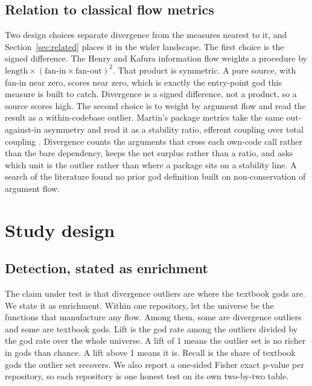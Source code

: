 \documentclass[11pt,a4paper]{article}
\begin{document}
\subsection{Relation to classical flow metrics}
Two design choices separate divergence from the measures nearest to it, and
Section~\ref{sec:related} places it in the wider landscape. The first choice is the
signed difference. The Henry and Kafura information flow \cite{henrykafura} weights
a procedure by $\mathrm{length} \times (\mathrm{fan\text{-}in} \times
\mathrm{fan\text{-}out})^2$. That product is symmetric. A pure source, with fan-in
near zero, scores near zero, which is exactly the entry-point god this measure is
built to catch. Divergence is a signed difference, not a product, so a source
scores high. The second choice is to weight by argument flow and read the result as
a within-codebase outlier. Martin's package metrics take the same out-against-in
asymmetry and read it as a stability ratio, efferent coupling over total coupling
\cite{martin}. Divergence counts the arguments that cross each own-code call rather
than the bare dependency, keeps the net surplus rather than a ratio, and asks which
unit is the outlier rather than where a package sits on a stability line. A search
of the literature found no prior god definition built on non-conservation of
argument flow.

\section{Study design}\label{sec:design}
\subsection{Detection, stated as enrichment}
The claim under test is that divergence outliers are where the textbook gods are.
We state it as enrichment. Within one repository, let the universe be the functions
that manufacture any flow. Among them, some are divergence outliers and some are
textbook gods. Lift is the god rate among the outliers divided by the god rate over
the whole universe. A lift of 1 means the outlier set is no richer in gods than
chance. A lift above 1 means it is. Recall is the share of textbook gods the
outlier set recovers. We also report a one-sided Fisher exact p-value per
repository, so each repository is one honest test on its own two-by-two table.
\end{document}
